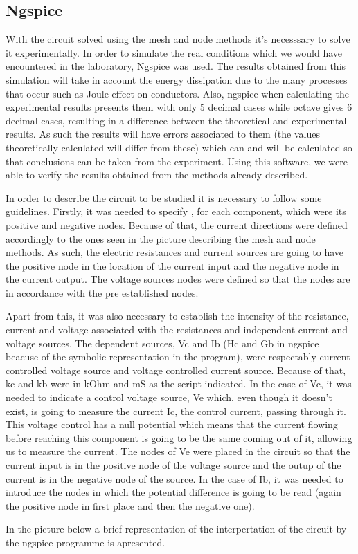
\subsection{Ngspice}

\par With the circuit solved using the mesh and node methods it's necesssary to solve it experimentally. In order to simulate the real conditions which we would have encountered in the laboratory, Ngspice was used. The results obtained from this simulation will take in account the energy dissipation due to the many processes that occur such as Joule effect on conductors. Also, ngspice when calculating the experimental results presents them with only 5 decimal cases while octave gives 6 decimal cases, resulting in a difference between the theoretical and experimental results. As such the results will have errors associated to them (the values theoretically calculated will differ from these) which can and will be calculated so that conclusions can be taken from the experiment. Using this software, we were able to verify the results obtained from the methods already described. 
\par In order to describe the circuit to be studied it is necessary to follow some guidelines. Firstly, it was needed to specify , for each component, which were its positive and negative nodes. Because of that, the current directions were defined accordingly to the ones seen in the picture describing the mesh and node methods. As such, the electric resistances and current sources are going to have the positive node in the location of the current input and the negative node in the current output. The voltage sources nodes were defined so that the nodes are in accordance with the pre established nodes.
\par Apart from this, it was also necessary to establish the intensity of the resistance, current and voltage associated with the resistances and independent current and voltage sources. The dependent sources, Vc and Ib (Hc and Gb in ngspice beacuse of the symbolic representation in the program), were respectably current controlled voltage source and voltage controlled current source. Because of that, kc and kb were in kOhm and mS as the script indicated. In the case of Vc, it was needed to indicate a control voltage source, Ve which, even though it doesn't exist, is going to measure the current Ic, the control current, passing through it. This voltage control has a null potential which means that the current flowing before reaching this component is going to be the same coming out of it, allowing us to measure the current. The nodes of Ve were placed in the circuit so that the current input is in the positive node of the voltage source and the outup of the current is in the negative node of the source.  In the case of Ib, it was needed to introduce the nodes in which the potential difference is going to be read (again the positive node in first place and then the negative one).
\par In the picture below a brief representation of the interpertation of the circuit by the ngspice programme is apresented.

